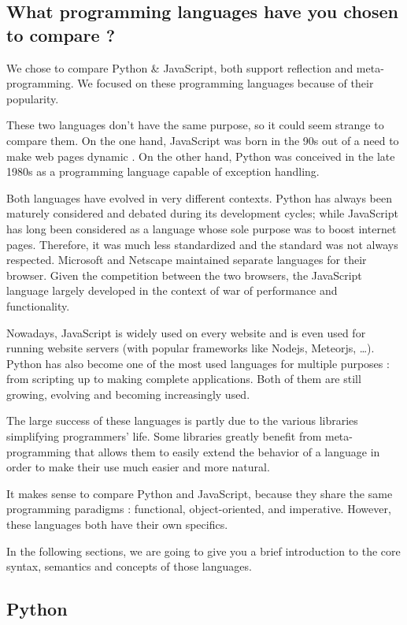 \documentclass[a4paper,10pt]{article}
\begin{document}
\subsection{What programming languages have you chosen to compare ?}

We chose to compare Python \& JavaScript, both support reflection and meta-programming.
We focused on these programming languages because of their popularity.

These two languages don’t have the same purpose, so it could seem strange to compare them. On the one hand, JavaScript was born in the 90s out of a need to make web pages dynamic . On the other hand, Python was conceived in the late 1980s as a programming language capable of exception handling.

Both languages have evolved in very different contexts. Python has always been maturely considered and debated during its development cycles; while JavaScript has long been considered as a language whose sole purpose was to boost internet pages. Therefore, it was much less standardized and the standard was not always respected. Microsoft and Netscape maintained separate languages for their browser. Given the competition between the two browsers, the JavaScript language largely developed in the context of war of performance and functionality.

Nowadays, JavaScript is widely used on every website and is even used for running website servers (with popular frameworks like Nodejs, Meteorjs, \dots). Python has also become one of the most used languages for multiple purposes : from scripting up to making complete applications. Both of them are still growing, evolving and becoming increasingly used.

The large success of these languages is partly due to the various libraries simplifying  programmers' life. Some libraries greatly benefit from meta-programming that allows them to easily extend the behavior of a language in order to make their use much easier and more natural.

It makes sense to compare Python and JavaScript, because they share the same programming paradigms : functional, object-oriented, and imperative. However, these languages both have their own specifics.

In the following sections, we are going to give you a brief introduction to the core syntax, semantics and concepts of those languages.

\subsection{Python}
\setpy
\end{document}
